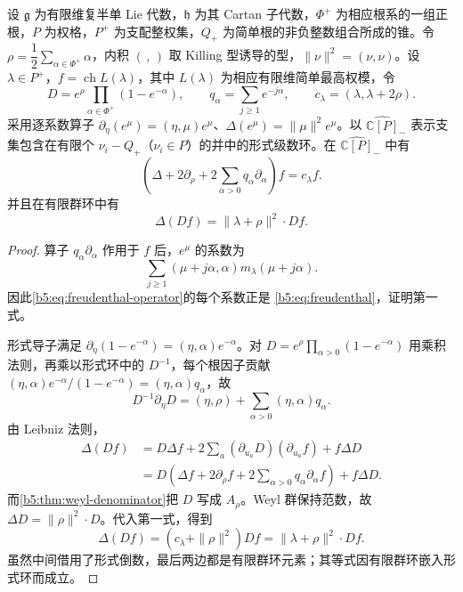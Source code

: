 \begin{proposition}\label{b5:prop:freudenthal-operator}
	设 \(\mathfrak g\) 为有限维复半单 Lie 代数，\(\mathfrak h\) 为其 Cartan 子代数，\(\Phi^+\) 为相应根系的一组正根，\(P\) 为权格，\(P^+\) 为支配整权集，\(Q_+\) 为简单根的非负整数组合所成的锥。令 \(\rho=\dfrac12\sum_{\alpha\in\Phi^+}\alpha\)，内积 \((\, ,\,)\) 取 Killing 型诱导的型，\(\|\nu\|^2=(\nu,\nu)\)。设 \(\lambda\in P^+\)，\(f=\operatorname{ch}L(\lambda)\)，其中 \(L(\lambda)\) 为相应有限维简单最高权模，令
	\[
		D=e^\rho\prod_{\alpha\in\Phi^+}(1-e^{-\alpha}),\qquad q_\alpha=\sum_{j\ge1}e^{-j\alpha},\qquad c_\lambda=(\lambda,\lambda+2\rho).
	\]
	采用逐系数算子 \(\partial_\eta(e^\mu)=(\eta,\mu)e^\mu\)、\(\Delta(e^\mu)=\|\mu\|^2e^\mu\)。以 \(\widehat{\mathbb C[P]}_-\) 表示支集包含在有限个 \(\nu_i-Q_+\)（\(\nu_i\in P\)）的并中的形式级数环。在 \(\widehat{\mathbb C[P]}_-\) 中有
	\begin{equation}\label{b5:eq:freudenthal-operator}
		\left(\Delta+2\partial_\rho+ 2\sum_{\alpha>0}q_\alpha\partial_\alpha\right)f =c_\lambda f.
	\end{equation}
	并且在有限群环中有
	\begin{equation}\label{b5:eq:denominator-laplacian}
		\Delta(Df)=\|\lambda+\rho\|^2\cdot Df.
	\end{equation}
\end{proposition}
\begin{proof}
	算子 \(q_\alpha\partial_\alpha\) 作用于 \(f\) 后，\(e^\mu\) 的系数为
	\[
		\sum_{j\ge1}(\mu+j\alpha,\alpha)m_\lambda(\mu+j\alpha).
	\]
	因此\eqref{b5:eq:freudenthal-operator}的每个系数正是 \eqref{b5:eq:freudenthal}，证明第一式。

	形式导子满足 \(\partial_\eta(1-e^{-\alpha})=(\eta,\alpha)e^{-\alpha}\)。对 \(D=e^\rho\prod_{\alpha>0}(1-e^{-\alpha})\) 用乘积法则，再乘以形式环中的 \(D^{-1}\)，每个根因子贡献 \((\eta,\alpha)e^{-\alpha}/(1-e^{-\alpha})=(\eta,\alpha)q_\alpha\)，故
	\[
		D^{-1}\partial_\eta D =(\eta,\rho)+\sum_{\alpha>0}(\eta,\alpha)q_\alpha.
	\]
	由 Leibniz 法则，
	\begin{align*}
		\Delta(Df) &=D\Delta f+2\sum_a(\partial_{u_a}D)(\partial_{u_a}f)+f\Delta D\\
		&=D\left(\Delta f+2\partial_\rho f+ 2\sum_{\alpha>0}q_\alpha\partial_\alpha f\right)+f\Delta D.
	\end{align*}
	而\cref{b5:thm:weyl-denominator}把 \(D\) 写成 \(A_\rho\)。Weyl 群保持范数，故 \(\Delta D=\|\rho\|^2\cdot D\)。代入第一式，得到
	\[
		\Delta(Df)=(c_\lambda+\|\rho\|^2)Df =\|\lambda+\rho\|^2\cdot Df.
	\]
	虽然中间借用了形式倒数，最后两边都是有限群环元素；其等式因有限群环嵌入形式环而成立。
\end{proof}

